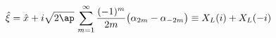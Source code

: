 \begin{equation}
\hat{\xi}=\hat{x}+i\sqrt{2\ap}\,
\sum_{m=1}^{\infty}\frac{(-1)^m}{2m}\bigl(
\alpha_{2m}-\alpha_{-2m}\bigr)
\equiv X_L(i)+X_L(-i)
\label{xi}
\end{equation}

